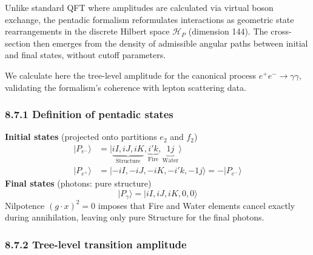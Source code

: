 \documentclass[11pt]{article}
\let\oldmathcal\mathcal
\renewcommand{\mathcal}[1]{\oldmathcal{#1}}
\begin{document}
Unlike standard QFT where amplitudes are calculated via virtual boson
exchange, the pentadic formalism reformulates interactions as geometric
state rearrangements in the discrete Hilbert space \(\mathcal{H}_P\)
(dimension 144). The cross-section then emerges from the density of
admissible angular paths between initial and final states, without
cutoff parameters.

We calculate here the tree-level amplitude for the canonical process
\(e^+e^- \to \gamma\gamma\), validating the formalism's coherence with
lepton scattering data.

\hypertarget{definition-of-pentadic-states}{%
\subsubsection{8.7.1 Definition of pentadic
states}\label{definition-of-pentadic-states}}

\textbf{Initial states} (projected onto partitions \(e_2\) and \(f_2\))
\[
\begin{aligned}
|P_{e^-}\rangle &= \big| { \underbrace{iI, iJ, iK}_{\text{Structure}}, \underbrace{i'k}_{\text{Fire}}, \underbrace{1j}_{\text{Water}} } \big\rangle \\
|P_{e^+}\rangle &= \big| { -iI, -iJ, -iK, -i'k, -1j } \big\rangle = -|P_{e^-}\rangle
\end{aligned}
\] \textbf{Final states} (photons: pure structure) \[
|P_{\gamma}\rangle = \big| { iI, iJ, iK, 0, 0 } \big\rangle
\] Nilpotence \((g\cdot x)^2=0\) imposes that Fire and Water elements
cancel exactly during annihilation, leaving only pure Structure for the
final photons.

\hypertarget{tree-level-transition-amplitude}{%
\subsubsection{8.7.2 Tree-level transition
amplitude}\label{tree-level-transition-amplitude}}
\end{document}
